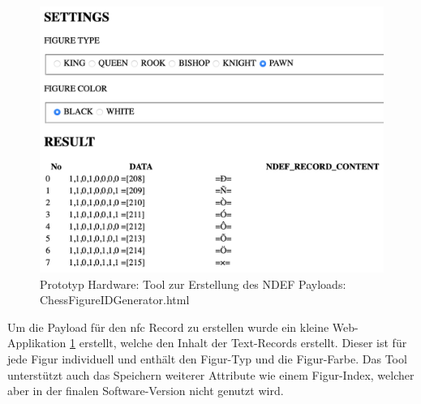 \begin{figure}
\centering
\includegraphics{images/ATC_ChessFigureIDGenerator.png}
\caption{Prototyp Hardware: Tool zur Erstellung des NDEF Payloads:
ChessFigureIDGenerator.html \label{ATC_ChessFigureIDGenerator}}
\end{figure}

Um die Payload für den \gls{nfc} Record zu erstellen wurde ein kleine
Web-Applikation \ref{ATC_ChessFigureIDGenerator} erstellt, welche den
Inhalt der Text-Records erstellt. Dieser ist für jede Figur individuell
und enthält den Figur-Typ und die Figur-Farbe. Das Tool unterstützt auch
das Speichern weiterer Attribute wie einem Figur-Index, welcher aber in
der finalen Software-Version nicht genutzt wird.

